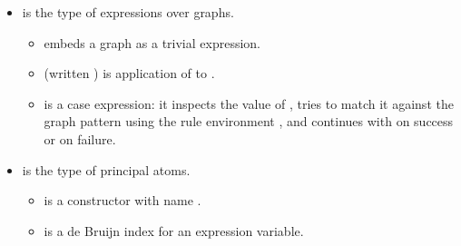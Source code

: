 \begin{isabellebody}
\begin{isamarkuptext}
\begin{itemize}
\begin{itemize}
\item {} is an atomic cell with principal atom  and a list
 of incident links.

\item {} represents a fusion (equality) constraint between links
 and .

\item {} is the parallel composition (multiset union) of graphs
 and .

\item {} introduces a fresh link scope around .  The binder
 binds link index  in ; all other free link
indices in  are shifted accordingly.%
\end{itemize}

\item {} is the type of expressions over graphs.

%
\begin{itemize}%
\item {} embeds a graph  as a trivial expression.

\item {} (written ) is application of  to .

\item {} is a case expression:
it inspects the value of , tries to match it against the
graph pattern  using the rule environment \isa{{\isasymGamma}}, and
continues with  on success or  on failure.%
\end{itemize}

\item {} is the type of principal atoms.

%
\begin{itemize}%
\item {} is a constructor with name .

\item {} is a de Bruijn index  for an expression variable.


\end{itemize}
\end{itemize}
\end{isamarkuptext}
\end{isabellebody}
